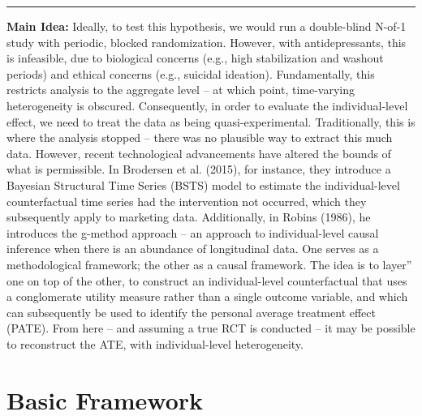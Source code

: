 \documentclass[12pt,letterpaper,doublespace, oneside]{article}
\begin{document}
\noindent\rule{\linewidth}{0.4pt}

\noindent


\noindent\textbf{Main Idea:}
Ideally, to test this hypothesis, we would run a double-blind N-of-1 study with periodic, blocked randomization. However, with antidepressants, this is infeasible, due to biological concerns (e.g., high stabilization and washout periods) and ethical concerns (e.g., suicidal ideation). Fundamentally, this restricts analysis to the aggregate level -- at which point, time-varying heterogeneity is obscured. Consequently, in order to evaluate the individual-level effect, we need to treat the data as being quasi-experimental. Traditionally, this is where the analysis stopped -- there was no plausible way to extract this much data. However, recent technological advancements have altered the bounds of what is permissible. In Brodersen et al. (2015), for instance, they introduce a Bayesian Structural Time Series (BSTS) model to estimate the individual-level counterfactual time series had the intervention not occurred, which they subsequently apply to marketing data. Additionally, in Robins (1986), he introduces the g-method approach -- an approach to individual-level causal inference when there is an abundance of longitudinal data. One serves as a methodological framework; the other as a causal framework. The idea is to layer'' one on top of the other, to construct an individual-level counterfactual that uses a conglomerate utility measure rather than a single outcome variable, and which can subsequently be used to identify the personal average treatment effect (PATE). From here -- and assuming a true RCT is conducted -- it may be possible to reconstruct the ATE, with individual-level heterogeneity. 


\newpage
\section{Basic Framework}
\end{document}
